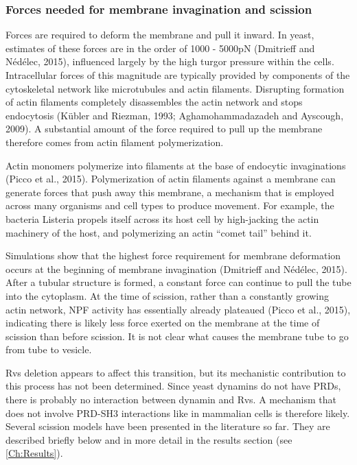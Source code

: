 \vspace{5mm}
		\subsubsection{Forces needed for membrane invagination and scission}
Forces are required to deform the membrane and pull it inward. In yeast, estimates of these forces are in the order of 1000 - 5000pN (Dmitrieff and Nédélec, 2015), influenced largely by the high turgor pressure within the cells. Intracellular forces of this magnitude are typically provided by components of the cytoskeletal network like microtubules and actin filaments. Disrupting formation of actin filaments completely disassembles the actin network and stops endocytosis (Kübler and Riezman, 1993; Aghamohammadazadeh and Ayscough, 2009). A substantial amount of the force required to pull up the membrane therefore comes from actin filament polymerization.

\vspace{5mm}
Actin monomers polymerize into filaments at the base of endocytic invaginations (Picco et al., 2015). Polymerization of actin filaments against a membrane can generate forces that push away this membrane, a mechanism that is employed across many organisms and cell types to produce movement. For example, the bacteria Listeria propels itself across its host cell by high-jacking the actin machinery of the host, and polymerizing an actin “comet tail” behind it. 

\vspace{5mm}
Simulations show that the highest force requirement for membrane deformation occurs at the beginning of membrane invagination (Dmitrieff and Nédélec, 2015). After a tubular structure is formed, a constant force can continue to pull the tube into the cytoplasm. At the time of scission, rather than a constantly growing actin network, NPF activity has essentially already plateaued (Picco et al., 2015), indicating there is likely less force exerted on the membrane at the time of scission than before scission. It is not clear what causes the membrane tube to go from tube to vesicle.  

\vspace{5mm}
Rvs deletion appears to affect this transition, but its mechanistic contribution to this process has not been determined. Since yeast dynamins do not have PRDs, there is probably no interaction between dynamin and Rvs. A mechanism that does not involve PRD-SH3 interactions like in mammalian cells is therefore likely. Several scission models have been presented in the literature so far. They are described briefly below and in more detail in the results section (see \ref{Ch:Results}). 


